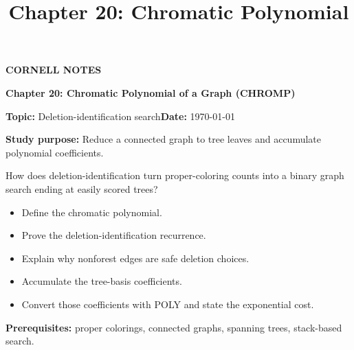 \documentclass[10pt,letterpaper]{article}
\title{Chapter 20: Chromatic Polynomial}
\author{}
\date{}
\begin{document}
\maketitle
\begin{tcolorbox}[colback=Paper,colframe=Ink]{\small\bfseries\color{Teal}CORNELL NOTES}\par{\LARGE\bfseries Chapter 20: Chromatic Polynomial of a Graph (CHROMP)}\par\medskip\textbf{Topic:} Deletion-identification search\hfill\textbf{Date:} \today\par\textbf{Study purpose:} Reduce a connected graph to tree leaves and accumulate polynomial coefficients.\end{tcolorbox}
\begin{tcolorbox}[colback=Teal!5,colframe=Teal,title=Essential question]How does deletion-identification turn proper-coloring counts into a binary graph search ending at easily scored trees?\end{tcolorbox}
\begin{tcolorbox}[colback=white,colframe=Mist,title=Learning objectives]\begin{itemize}\item Define the chromatic polynomial.\item Prove the deletion-identification recurrence.\item Explain why nonforest edges are safe deletion choices.\item Accumulate the tree-basis coefficients.\item Convert those coefficients with POLY and state the exponential cost.\end{itemize}\textbf{Prerequisites:} proper colorings, connected graphs, spanning trees, stack-based search.\end{tcolorbox}
\end{document}
